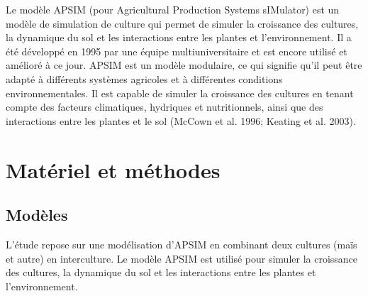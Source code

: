 \documentclass[
]{article}
\begin{document}
Le modèle APSIM (pour Agricultural Production Systems sIMulator) est un
modèle de simulation de culture qui permet de simuler la croissance des
cultures, la dynamique du sol et les interactions entre les plantes et
l'environnement. Il a été développé en 1995 par une équipe
multiuniversitaire et est encore utilisé et amélioré à ce jour. APSIM
est un modèle modulaire, ce qui signifie qu'il peut être adapté à
différents systèmes agricoles et à différentes conditions
environnementales. Il est capable de simuler la croissance des cultures
en tenant compte des facteurs climatiques, hydriques et nutritionnels,
ainsi que des interactions entre les plantes et le sol (McCown et al.
1996; Keating et al. 2003).\\

\newpage

\section{Matériel et méthodes}\label{matuxe9riel-et-muxe9thodes}

\subsection{Modèles}\label{moduxe8les}

L'étude repose sur une modélisation d'APSIM en combinant deux cultures
(maïs et autre) en interculture. Le modèle APSIM est utilisé pour
simuler la croissance des cultures, la dynamique du sol et les
interactions entre les plantes et l'environnement.
\end{document}
